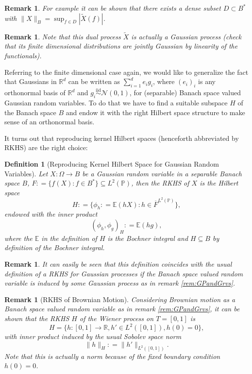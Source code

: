 \documentclass[11pt,reqno]{amsart}
\numberwithin{equation}{section}
\newtheorem{defi}[thm]{Definition}
\newtheorem{rem}[thm]{Remark}
\newcommand{\deq}{\mathrel{\mathop:}=}
\newcommand{\iidnormal}{\mathrel{\stackrel{\text{iid}}{\sim}}\mathcal N(0,1)}
\begin{document}
\begin{rem}
	For example it can be shown that there exists a dense subset $D\subset B^*$ with $\|X\|_B = \sup_{f\in D}|\tilde X(f)|$.
\end{rem}

\begin{rem}
	Note that this dual process $\tilde X$ is actually a Gaussian process (check that its finite dimensional distributions are \emph{jointly} Gaussian by linearity of the functionals).
\end{rem}

Referring to the finite dimensional case again, we would like to generalize the fact that Gaussians in $\mathbb R^d$ can be written as $\sum_{i=1}^d e_ig_i$, where $(e_i)_i$ is any orthonormal basis of $\mathbb R^d$ and $g_i\iidnormal$, for (separable) Banach space valued Gaussian random variables. To do that we have to find a suitable subspace $H$ of the Banach space $B$ and endow it with the right Hilbert space structure to make sense of an orthonormal basis.

It turns out that reproducing kernel Hilbert spaces (henceforth abbreviated by RKHS) are the right choice:

\begin{defi}[Reproducing Kernel Hilbert Space for Gaussian Random Variables]
	Let $X:\Omega\rightarrow B$ be a Gaussian random variable in a separable Banach space $B$, $F\deq\{f(X):f\in B^*\}\subseteq L^2(\mathbb P)$, then the RKHS of $X$ is the Hilbert space $$H\deq\{\phi_h\deq\mathbb E(hX): h\in\overline F^{L^2(\mathbb P)}\},$$
	endowed with the inner product
	$$(\phi_h,\phi_g)_H\deq\mathbb E(hg),$$
	where the $\mathbb E$ in the definition of $H$ is the Bochner integral and $H\subseteq B$ by definition of the Bochner integral.
\end{defi}
\begin{rem}
	It can easily be seen that this definition coincides with the usual definition of a RKHS for Gaussian processes if the Banach space valued random variable is induced by some Gaussian process as in remark \ref{rem:GPandGrvs}.
\end{rem}

\begin{rem}[RKHS of Brownian Motion]\label{rem:RKHSofBM}
	Considering Brownian motion as a Banach space valued random variable as in remark \ref{rem:GPandGrvs}, it can be shown that the RKHS $H$ of the Wiener process on $T=[0,1]$ is $$H = \{h:[0,1]\rightarrow\mathbb R, h'\in L^2([0,1]), h(0)=0\},$$ with inner product induced by the usual Sobolev space norm $$\|h\|_H\deq \|h'\|_{L^2([0,1])}.$$
	Note that this is actually a norm because of the fixed boundary condition $h(0)=0$.
\end{rem}
\end{document}
